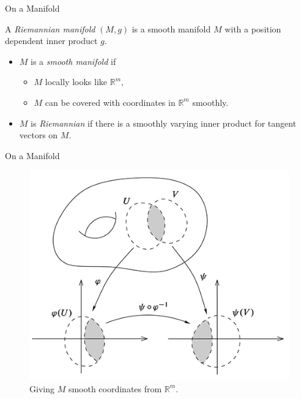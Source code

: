 \documentclass[usenames,dvipsnames]{beamer}
\theoremstyle{definition}
\theoremstyle{theorem}
\newcommand{\R}{\mathbb{R}}
\begin{document}
        \begin{frame}{On a Manifold}
            \begin{definition}
            A \emph{Riemannian manifold} $(M,g)$ is a smooth manifold $M$ with a position dependent inner product $g$.
            \end{definition}
            \pause
            \begin{itemize}
                \item $M$ is a \emph{smooth manifold} if
                \begin{itemize}
                \pause
                    \item $M$ locally looks like $\R^m$,
                    \item $M$ can be covered with coordinates in $\R^m$ smoothly.
                \end{itemize}
                \pause
                \item $M$ is \emph{Riemannian} if there is a smoothly varying inner product for tangent vectors on $M$.
            \end{itemize}
        \end{frame}
        
        \begin{frame}{On a Manifold}
            \begin{figure}
                \centering
                \includegraphics[width=.6\textwidth]{images/smooth_manifold.png}
                \caption{Giving $M$ smooth coordinates from $\R^m$.}
            \end{figure}
        \end{frame}
        
\end{document}
